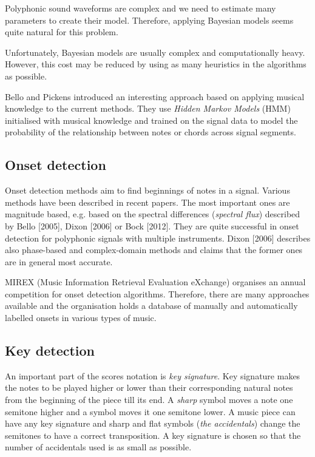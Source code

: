 \documentclass[11pt]{article} %
\begin{document}
Polyphonic sound waveforms are complex and we need to estimate many parameters to create their model. Therefore, applying Bayesian models seems quite natural for this problem.

Unfortunately, Bayesian models are usually complex and computationally heavy. However, this cost may be reduced by using as many heuristics in the algorithms as possible.  


Bello and Pickens \citeyearpar{BelloPickens2005} introduced an interesting approach based on applying musical knowledge to the current methods. They use \textit{Hidden Markov Models} (HMM) initialised with musical knowledge and trained on the signal data to model the probability of the relationship between notes or chords across signal segments.

\subsection{Onset detection}
Onset detection methods aim to find beginnings of notes in a signal. Various methods have been described in recent papers. The most important ones are magnitude based, e.g. based on the spectral differences (\textit{spectral flux}) described by Bello [2005], Dixon [2006] or Bock [2012]. They are quite successful in onset detection for polyphonic signals with multiple instruments. Dixon [2006] describes also phase-based and complex-domain methods and claims that the former ones are in general most accurate.

MIREX (Music Information Retrieval Evaluation eXchange) organises an annual competition for onset detection algorithms. Therefore, there are many approaches available and the organisation holds a database of manually and automatically labelled onsets in various types of music. 

\subsection{Key detection}
An important part of the scores notation is \textit{key signature}. Key signature makes the notes to be played higher or lower than their corresponding natural notes from the beginning of the piece till its end. A \textit{sharp} symbol moves a note one semitone higher and a  symbol moves it one semitone lower. A music piece can have any key signature and sharp and flat symbols (\textit{the accidentals}) change the semitones to have a correct transposition. A key signature is chosen so that the number of accidentals used is as small as possible. 
\end{document}
